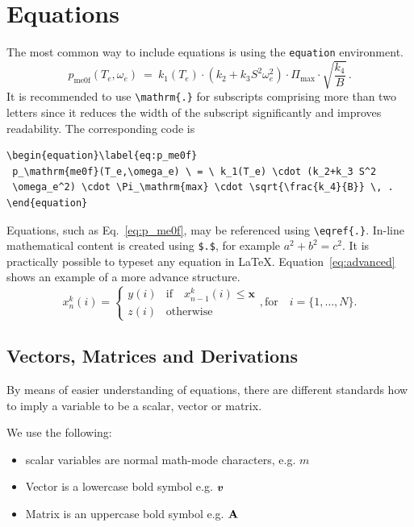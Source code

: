 \section{Equations}\label{sec:math}
The most common way to include equations is using the \texttt{equation} environment.
\begin{equation}\label{eq:p_me0f}
 p_\mathrm{me0f}(T_e,\omega_e) \ = \ k_1(T_e) \cdot (k_2+k_3 S^2
 \omega_e^2) \cdot \Pi_\mathrm{max} \cdot \sqrt{\frac{k_4}{B}} \, .
\end{equation}
It is recommended to use \texttt{\textbackslash mathrm\{.\}} for subscripts comprising more than two letters since it reduces the width of the subscript significantly and improves readability. The corresponding code is
\begin{verbatim}
\begin{equation}\label{eq:p_me0f}
 p_\mathrm{me0f}(T_e,\omega_e) \ = \ k_1(T_e) \cdot (k_2+k_3 S^2
 \omega_e^2) \cdot \Pi_\mathrm{max} \cdot \sqrt{\frac{k_4}{B}} \, .
\end{equation}
\end{verbatim}
Equations, such as Eq.~\eqref{eq:p_me0f}, may be referenced using \texttt{\textbackslash eqref\{.\}}. In-line mathematical content is created using \texttt{\$.\$}, for example $a^2+b^2=c^2$. It is practically possible to typeset any equation in \LaTeX. Equation~\eqref{eq:advanced} shows an example of a more advance structure.
\begin{equation}\label{eq:advanced}
x^k_n(i) = \left\{\begin{array}{ll}y(i) & \text{if}\quad x^k_{n-1}(i)\leq \mathbf{x}\\
z(i) & \text{otherwise}\end{array}\right., \text{for}\quad i=\{1,\ldots,N\}.
\end{equation}


\subsection{Vectors, Matrices and Derivations}

By means of easier understanding of equations, there are different standards how to imply a variable to be a scalar, vector or matrix.

We use the following:
\begin{itemize}
	\item scalar variables are normal math-mode characters, e.g. $m$
	\item Vector is a lowercase bold symbol e.g. $\boldsymbol{v}$
	\item Matrix is an uppercase bold symbol e.g. $\mathbf{A}$
\end{itemize}

